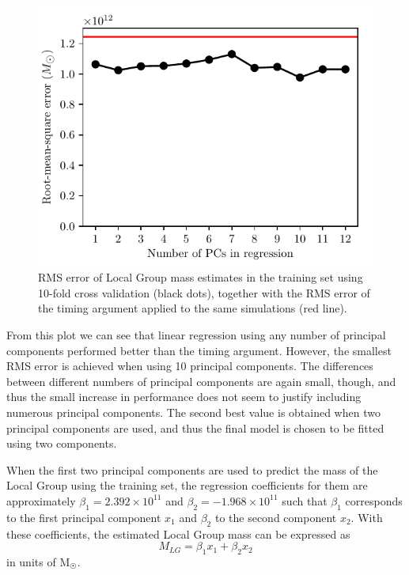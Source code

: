 \documentclass[english, oneside]{HYgradu}
\begin{document}
\begin{figure}
    \centering
    \includegraphics{kuvat/PCA/training-RMSE.pdf}
    \caption{RMS error of Local Group mass estimates in the training set using 10-fold cross validation (black dots), together with the RMS error of the timing argument applied to the same simulations (red line).}\label{fig:pca-rmse-training}
\end{figure}

From this plot we can see that linear regression using any number of principal components performed better than the timing argument. However, the smallest RMS error is achieved when using 10 principal components. The differences between different numbers of principal components are again small, though, and thus the small increase in performance does not seem to justify including numerous principal components. The second best value is obtained when two principal components are used, and thus the final model is chosen to be fitted using two components.

When the first two principal components are used to predict the mass of the Local Group using the training set, the regression coefficients for them are approximately $\beta_1 = 2.392 \times 10^{11}$ and $\beta_2 = -1.968 \times 10^{11}$ such that $\beta_1$ corresponds to the first principal component $x_1$ and $\beta_2$ to the second component $x_2$. With these coefficients, the estimated Local Group mass can be expressed as
\begin{equation} \label{equ:pcr}
	M_{LG} = \beta_1 x_{1} + \beta_2 x_{2}
\end{equation}
in units of $\mathrm{M}_{\astrosun}$. 
\end{document}
